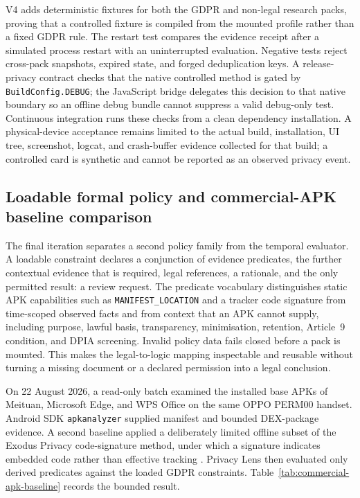 V4 adds deterministic fixtures for both the GDPR and non-legal research packs, proving that a controlled fixture is compiled from the mounted profile rather than a fixed GDPR rule. The restart test compares the evidence receipt after a simulated process restart with an uninterrupted evaluation. Negative tests reject cross-pack snapshots, expired state, and forged deduplication keys. A release-privacy contract checks that the native controlled method is gated by \texttt{BuildConfig.DEBUG}; the JavaScript bridge delegates this decision to that native boundary so an offline debug bundle cannot suppress a valid debug-only test. Continuous integration runs these checks from a clean dependency installation. A physical-device acceptance remains limited to the actual build, installation, UI tree, screenshot, logcat, and crash-buffer evidence collected for that build; a controlled card is synthetic and cannot be reported as an observed privacy event.

\subsection{Loadable formal policy and commercial-APK baseline comparison}

The final iteration separates a second policy family from the temporal evaluator. A loadable constraint declares a conjunction of evidence predicates, the further contextual evidence that is required, legal references, a rationale, and the only permitted result: a review request. The predicate vocabulary distinguishes static APK capabilities such as \texttt{MANIFEST\_LOCATION} and a tracker code signature from time-scoped observed facts and from context that an APK cannot supply, including purpose, lawful basis, transparency, minimisation, retention, Article~9 condition, and DPIA screening. Invalid policy data fails closed before a pack is mounted. This makes the legal-to-logic mapping inspectable and reusable without turning a missing document or a declared permission into a legal conclusion.

On 22 August 2026, a read-only batch examined the installed base APKs of Meituan, Microsoft Edge, and WPS Office on the same OPPO PERM00 handset. Android SDK \texttt{apkanalyzer} supplied manifest and bounded DEX-package evidence. A second baseline applied a deliberately limited offline subset of the Exodus Privacy code-signature method, under which a signature indicates embedded code rather than effective tracking \cite{exodusprivacy2026}. Privacy Lens then evaluated only derived predicates against the loaded GDPR constraints. Table~\ref{tab:commercial-apk-baseline} records the bounded result.

